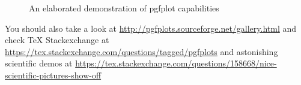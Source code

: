 \begin{figure}[H]
    \caption{An elaborated demonstration of pgfplot capabilities}
    \label{fig:An elaborated demonstration of pgfplot capabilities}
\end{figure}

You should also take a look at \url{http://pgfplots.sourceforge.net/gallery.html} and check TeX Stackexchange at \url{https://tex.stackexchange.com/questions/tagged/pgfplots} and astonishing scientific demos at \url{https://tex.stackexchange.com/questions/158668/nice-scientific-pictures-show-off}

